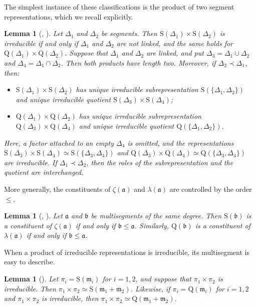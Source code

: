 \documentclass[11pt]{amsart}
\numberwithin{equation}{section}
\theoremstyle{plain}
\newtheorem{lemma}[theorem]{Lemma}
\theoremstyle{definition}
\theoremstyle{remark}
\newcommand{\mm}{\mathfrak{m}}
\newcommand{\bb}{\mathfrak{b}}
\newcommand{\aaa}{\mathfrak{a}}
\newcommand{\Ss}{\mathrm{S}}
\newcommand{\Qq}{\mathrm{Q}}
\begin{document}
The simplest instance of these classifications is the product of two segment representations, which we recall explicitly.

\begin{lemma}[{\cite[Proposition 3.5 and Theorem 3.6]{LM16}}, {\cite[Proposition 4.3]{Tad90}}]\label{lem:two-segments}
	Let $\Delta_1$ and $\Delta_2$ be segments. Then $\Ss(\Delta_1)\times\Ss(\Delta_2)$ is irreducible if and only if $\Delta_1$ and $\Delta_2$ are not linked, and the same holds for $\Qq(\Delta_1)\times\Qq(\Delta_2)$. Suppose that $\Delta_1$ and $\Delta_2$ are linked, and put $\Delta_3=\Delta_1\cup\Delta_2$ and $\Delta_4=\Delta_1\cap\Delta_2$. Then both products have length two. Moreover, if $\Delta_2\prec\Delta_1$, then:
	\begin{itemize}
		\item $\Ss(\Delta_1)\times\Ss(\Delta_2)$ has unique irreducible subrepresentation $\Ss(\{\Delta_1,\Delta_2\})$ and unique irreducible quotient $\Ss(\Delta_3)\times\Ss(\Delta_4)$;
		\item $\Qq(\Delta_1)\times\Qq(\Delta_2)$ has unique irreducible subrepresentation $\Qq(\Delta_3)\times\Qq(\Delta_4)$ and unique irreducible quotient $\Qq(\{\Delta_1,\Delta_2\})$.
	\end{itemize}
	Here, a factor attached to an empty $\Delta_4$ is omitted, and the representations $\Ss(\Delta_3)\times\Ss(\Delta_4)\simeq\Ss(\{\Delta_3,\Delta_4\})$ and $\Qq(\Delta_3)\times\Qq(\Delta_4)\simeq\Qq(\{\Delta_3,\Delta_4\})$ are irreducible. If $\Delta_1\prec\Delta_2$, then the roles of the subrepresentation and the quotient are interchanged.
\end{lemma}

More generally, the constituents of $\zeta(\aaa)$ and $\lambda(\aaa)$ are controlled by the order $\le$.

\begin{lemma}[{\cite[Proposition 3.5 and Theorem 3.6]{LM16}}, {\cite[Proposition 4.4]{Tad90}}]\label{lem:constituents}
	Let $\aaa$ and $\bb$ be multisegments of the same degree. Then $\Ss(\bb)$ is a constituent of $\zeta(\aaa)$ if and only if $\bb\le\aaa$. Similarly, $\Qq(\bb)$ is a constituent of $\lambda(\aaa)$ if and only if $\bb\le\aaa$.
\end{lemma}

When a product of irreducible representations is irreducible, its multisegment is easy to describe.

\begin{lemma}[{\cite[\S3]{LM16}}]\label{lem:sum-multisegments}
	Let $\pi_i=\Ss(\mm_i)$ for $i=1,2$, and suppose that $\pi_1\times\pi_2$ is irreducible. Then $\pi_1\times\pi_2\simeq\Ss(\mm_1+\mm_2)$. Likewise, if $\pi_i=\Qq(\mm_i)$ for $i=1,2$ and $\pi_1\times\pi_2$ is irreducible, then $\pi_1\times\pi_2\simeq\Qq(\mm_1+\mm_2)$.
\end{lemma}
\end{document}
